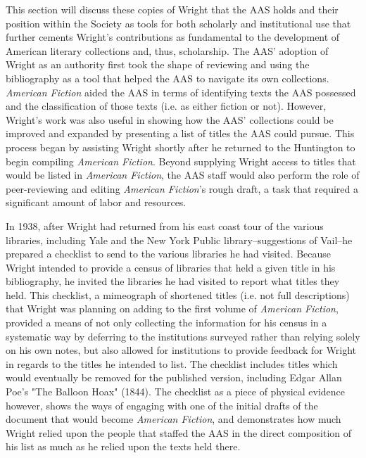 This section will discuss these copies of Wright that the AAS holds and their position within the Society as tools for both scholarly and institutional use that further cements Wright's contributions as fundamental to the development of American literary collections and, thus, scholarship. The AAS' adoption of Wright as an authority first took the shape of reviewing and using the bibliography as a tool that helped the AAS to navigate its own collections. \textit{American Fiction} aided the AAS in terms of identifying texts the AAS possessed and the classification of those texts (i.e. as either fiction or not). However, Wright's work was also useful in showing how the AAS' collections could be improved and expanded by presenting a list of titles the AAS could pursue. This process began by assisting Wright shortly after he returned to the Huntington to begin compiling \textit{American Fiction}. Beyond supplying Wright access to titles that would be listed in \textit{American Fiction}, the AAS staff would also perform the role of peer-reviewing and editing \textit{American Fiction}'s rough draft, a task that required a significant amount of labor and resources.

In 1938, after Wright had returned from his east coast tour of the various libraries, including Yale and the New York Public library--suggestions of Vail--he prepared a checklist to send to the various libraries he had visited. Because Wright intended to provide a census of libraries that held a given title in his bibliography, he invited the libraries he had visited to report what titles they held. This checklist, a mimeograph of shortened titles (i.e. not full descriptions) that Wright was planning on adding to the first volume of \textit{American Fiction}, provided a means of not only collecting the information for his census in a systematic way by deferring to the institutions surveyed rather than relying solely on his own notes, but also allowed for institutions to provide feedback for Wright in regards to the titles he intended to list. The checklist includes titles which would eventually be removed for the published version, including Edgar Allan Poe's "The Balloon Hoax" (1844). The checklist as a piece of physical evidence however, shows the ways of engaging with one of the initial drafts of the document that would become \textit{American Fiction}, and demonstrates how much Wright relied upon the people that staffed the AAS in the direct composition of his list as much as he relied upon the texts held there.

